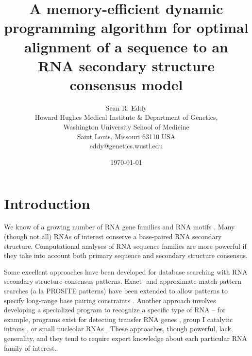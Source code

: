 \documentclass[11pt]{article}
\begin{document}
\title{A memory-efficient dynamic programming algorithm for optimal
alignment of a sequence to an RNA secondary structure consensus model}
\author{Sean R. Eddy\\
Howard Hughes Medical Institute \& Department of Genetics, \\
Washington University School of Medicine \\
Saint Louis, Missouri 63110 USA \\
eddy@genetics.wustl.edu}  
\date{\today}
\maketitle


\section{Introduction}

We know of a growing number of RNA gene families and RNA motifs
\cite{Eddy01,Erdmann01}. Many (though not all) RNAs of interest
conserve a base-paired RNA secondary structure. Computational analyses
of RNA sequence families are more powerful if they take into account
both primary sequence and secondary structure consensus.

Some excellent approaches have been developed for database searching
with RNA secondary structure consensus patterns. Exact- and
approximate-match pattern searches (a la PROSITE patterns) have been
extended to allow patterns to specify long-range base pairing
constraints \cite{Laferriere94,Dsouza97}. Another approach involves
developing a specialized program to recognize a specific type of RNA
\cite{Dandekar95} -- for example, programs exist for detecting
transfer RNA genes \cite{Fichant91,El-MabroukLisacek96,LoweEddy97},
group I catalytic introns \cite{Lisacek94}, or small nucleolar RNAs
\cite{Nicoloso96,LoweEddy98}. These approaches, though powerful, lack
generality, and they tend to require expert knowledge about each
particular RNA family of interest.
\end{document}
